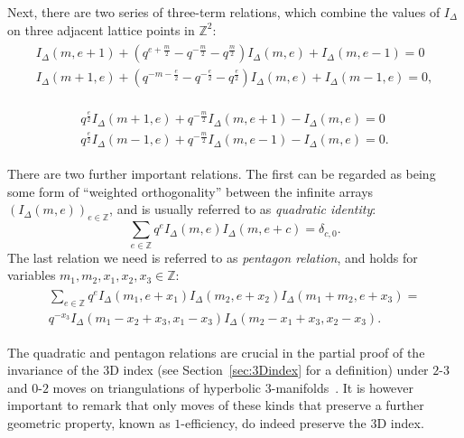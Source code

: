 \documentclass[11pt]{amsart}
\newcommand{\Z}{\mathbb{Z}}
\newcommand{\tet}{I_{\Delta}}
\begin{document}
Next, there are two series of three-term relations, which combine the values of $\tet$ on three adjacent lattice points in $\Z^2$:
\begin{gather}\label{eqn:index_3term_consecutive}
\begin{gathered}
I_\Delta\left(m,e+1\right)  +\left( q^{e+\frac{m}{2}}  - q^{-\frac{m}{2}} -q^{\frac{m}{2}} \right)I_\Delta\left(m,e\right)  + I_\Delta\left(m,e-1\right) = 0\\
I_\Delta\left(m+1,e\right)  +\left( q^{-m-\frac{e}{2}}  - q^{-\frac{e}{2}} -q^{\frac{e}{2}} \right)I_\Delta\left(m,e\right)  + I_\Delta\left(m-1,e\right) = 0,
\end{gathered}
\end{gather}

\begin{gather}\label{eqn:index_3term_adjacent}
\begin{gathered}
q^\frac{e}{2} I_\Delta\left(m+1,e\right)  +q^{-\frac{m}{2}} I_\Delta\left(m,e+1\right)  - I_\Delta\left(m,e\right) = 0\\
q^\frac{e}{2} I_\Delta\left(m-1,e\right)  +q^{-\frac{m}{2}} I_\Delta\left(m,e-1\right)  - I_\Delta\left(m,e\right) = 0.
\end{gathered}
\end{gather}

There are two further important relations. The first can be regarded as being some form of ``weighted orthogonality'' between the infinite arrays $\left(\tet(m,e)\right)_{e \in \Z}$, and is usually referred to as \emph{quadratic identity}:
\begin{equation}\label{eqn:quadratic_identity}
\sum_{e \in \Z} q^e \tet \left(m,e\right) \tet \left(m,e+c\right) = \delta_{c,0}.
\end{equation}
The last relation we need is referred to as \emph{pentagon relation}, and holds for variables $m_1,m_2,x_1,x_2,x_3 \in \Z$:
\begin{gather}\label{eqn:pentagon_identity}
\begin{gathered}
\sum_{e \in \Z} q^e \tet \left(m_1 ,e +x_1\right) \tet \left(m_2 ,e+x_2\right) \tet \left(m_1 +m_2, e + x_3\right) =\\ q^{-x_3} \tet \left(m_1-x_2+x_3,x_1-x_3\right) \tet \left(m_2-x_1+x_3, x_2-x_3\right).
\end{gathered}
\end{gather}


The quadratic and pentagon relations are crucial in the partial proof of the invariance of the $3$D index (see Section~\ref{sec:3Dindex} for a definition) under $2$-$3$ and $0$-$2$ moves on triangulations of hyperbolic $3$-manifolds~\cite{garoufalidis20163d, garoufalidis20151}. It is however important to remark that only moves of these kinds that preserve a further geometric property, known as $1$-efficiency, do indeed preserve the $3$D index.
\end{document}
